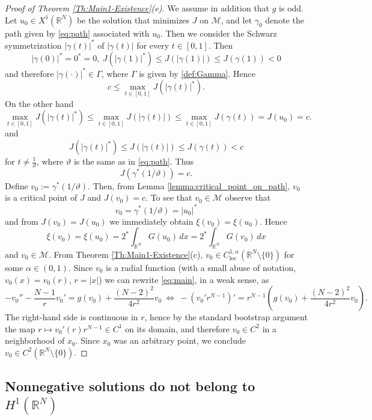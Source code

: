 \documentclass[12pt,leqno,twoside,sort]{amsart}
\newcommand{\R}{\mathbb{R}}
\newcommand{\cM}{{\mathcal M}}
\numberwithin{equation}{section}
\newcommand{\loc}{\mathrm{loc}}
\begin{document}
\begin{proof}[Proof of Theorem \ref{Th:Main1-Existence}(e)]
We assume in addition that $g$ is odd. Let $u_0 \in X^1 (\R^N)$ be the solution that minimizes $J$ on $\cM$, and let $\gamma_0$ denote the path given by \eqref{eq:path} associated with $u_0$. Then we consider the Schwarz symmetrization $|\gamma (t)|^*$ of $|\gamma(t)|$ for every $t \in [0,1]$. Then
$$
|\gamma (0)|^* = 0^* = 0, \ J(|\gamma(1)|^*) \leq J(|\gamma(1)|) \leq J(\gamma(1)) < 0
$$
and therefore $|\gamma (\cdot )|^* \in \Gamma$, where $\Gamma$ is given by \eqref{def:Gamma}. Hence
$$
c \leq \max_{t \in [0,1]} J (|\gamma (t)|^*).
$$
On the other hand
$$
\max_{t \in [0,1]} J (|\gamma (t)|^*) \leq \max_{t \in [0,1]} J (|\gamma (t)|)\leq \max_{t \in [0,1]} J(\gamma(t)) = J(u_0) = c.
$$
and
$$
J (|\gamma (t)|^*) \leq J(|\gamma(t)|) \leq J(\gamma(t)) < c
$$
for $t \neq \frac{1}{\vartheta}$, where $\vartheta$ is the same as in \eqref{eq:path}. Thus
$$
J (\gamma^* (1/\vartheta) ) = c.
$$
Define $v_0 := \gamma^* (1/\vartheta)$. Then, from Lemma \ref{lemma:critical_point_on_path}, $v_0$ is a critical point of $J$ and $J(v_0) = c$. To see that $v_0 \in \cM$ observe that
$$
v_0 = \gamma^*(1/\vartheta) = |u_0|^*
$$
and from $J(v_0) = J(u_0)$ we immediately obtain $\xi(v_0) = \xi(u_0)$. Hence
$$
\xi(v_0) = \xi(u_0) = 2^* \int_{\R^N} G(u_0) \, dx = 2^* \int_{\R^N} G(v_0) \, dx
$$
and $v_0 \in \cM$. From Theorem \ref{Th:Main1-Existence}(c), $v_0 \in C^{1,\alpha}_{\loc}(\R^N \setminus \{0\})$ for some $\alpha \in (0,1)$. Since $v_0$ is a radial function (with a small abuse of notation, $v_0(x)=v_0(r)$, $r=|x|$) we can rewrite \eqref{eq:main}, in a weak sense, as
\[
-v_0''-\frac{N-1}{r} v_0'=g(v_0)+\frac{(N-2)^2}{4r^2} v_0 \
\Longleftrightarrow \ -\left(v_0'r^{N-1}\right)'=r^{N-1}\left(g(v_0)+\frac{(N-2)^2}{4r^2} v_0\right).
\]
The right-hand side is continuous in $r$, hence by the standard bootstrap argument the map $r \mapsto v_0'(r)r^{N-1}\in C^1$ on its domain, and therefore $v_0\in C^2$ in a neighborhood of $x_0$. Since $x_0$ was an arbitrary point, we conclude $v_0\in C^2(\R^N\setminus\{0\})$.
\end{proof}





\subsection{Nonnegative solutions do not belong to \texorpdfstring{$H^1(\R^N)$}{H1}}
\end{document}
